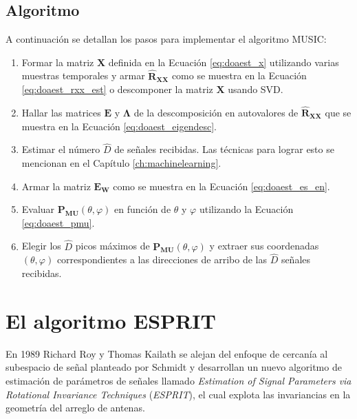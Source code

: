 \subsection{Algoritmo}\label{subc:doaest_music_alg}
A continuación se detallan los pasos para implementar el algoritmo MUSIC:
\begin{enumerate}
    \item Formar la matriz $\mathbf{X}$ definida en la Ecuación \ref{eq:doaest_x} utilizando varias muestras temporales y armar $\mathbf{\hat{R}_{XX}}$ como se muestra en la Ecuación \ref{eq:doaest_rxx_est} o descomponer la matriz $\mathbf{X}$ usando SVD.
    \item Hallar las matrices $\mathbf{E}$ y $\mathbf{\Lambda}$ de la descomposición en autovalores de $\mathbf{\hat{R}_{XX}}$ que se muestra en la Ecuación \ref{eq:doaest_eigendesc}.
    \item Estimar el número $\hat{D}$ de señales recibidas. Las técnicas para lograr esto se mencionan en el Capítulo \ref{ch:machinelearning}.
    \item Armar la matriz $\mathbf{E_W}$ como se muestra en la Ecuación \ref{eq:doaest_es_en}.
    \item Evaluar $\mathbf{P_{MU}}(\theta,\varphi)$ en función de $\theta$ y $\varphi$ utilizando la Ecuación \ref{eq:doaest_pmu}.
    \item Elegir los $\hat{D}$ picos máximos de $\mathbf{P_{MU}}(\theta,\varphi)$ y extraer sus coordenadas $(\theta,\varphi)$ correspondientes a las direcciones de arribo de las $\hat{D}$ señales recibidas.
\end{enumerate}

\section{El algoritmo ESPRIT}\label{subc:doaest_ESPRIT}

En 1989 Richard Roy y Thomas Kailath se alejan del enfoque de cercanía al subespacio de señal planteado por Schmidt y desarrollan un nuevo algoritmo de estimación de parámetros de señales llamado \emph{Estimation of Signal Parameters via Rotational Invariance Techniques} (\emph{ESPRIT}), el cual explota las invariancias en la geometría del arreglo de antenas.

